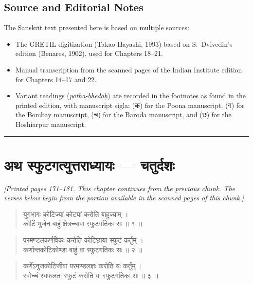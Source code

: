 \documentclass[11pt,a4paper]{article}
\newcommand{\longline}{\noindent\rule{\textwidth}{0.4pt}}
\newcommand{\cnote}[1]{\textcolor{notecolor}{\textit{#1}}}
\newcommand{\dev}[1]{{\devanagarifont #1}}
\newcommand{\dsec}[1]{\section*{\dev{#1}}}
\newenvironment{shloka}{\begin{verse}\devanagarifont\large}{\end{verse}}
\begin{document}
\subsection*{Source and Editorial Notes}

The Sanskrit text presented here is based on multiple sources:
\begin{itemize}
  \item The GRETIL digitization (Takao Hayashi, 1993) based on
    S.~Dvivedin's edition (Benares, 1902), used for Chapters 18–21.
  \item Manual transcription from the scanned pages of the Indian
    Institute edition for Chapters 14–17 and 22.
  \item Variant readings (\textit{pāṭha-bhedaḥ}) are recorded in the
    footnotes as found in the printed edition, with manuscript
    sigla: (क) for the Poona manuscript, (ग) for the Bombay manuscript,
    (च) for the Baroda manuscript, and (छ) for the Hoshiarpur manuscript.
\end{itemize}

\longline

\newpage

\dsec{अथ स्फुटगत्युत्तराध्यायः — चतुर्दशः}

\cnote{[Printed pages 171–181. This chapter continues from the previous
chunk. The verses below begin from the portion available in the scanned
pages of this chunk.]}

\begin{shloka}
युगभागः कोटिज्यां कोट्यां करोति बाहुज्याम् ।\\
कोटिं भुजेन बाहुं क्षेत्रच्चावा स्फुटगतिकः सः ॥ १ ॥
\end{shloka}

\begin{shloka}
परमण्डलकर्णविकः करोति कोटिछाया स्फुटं कर्तुम् ।\\
कर्णान्तकोटिकोण्डा बाहुं वा स्फुटगतिकः सः ॥ २ ॥
\end{shloka}

\begin{shloka}
कर्णेऽनुजकोटिजीवा परमण्डलज्ञः करोति यः कर्तुम् ।\\
स्वोच्चं स्वफलतः स्फुटं करोति यः स्फुटगतिकः सः ॥ ३ ॥
\end{shloka}
\end{document}
